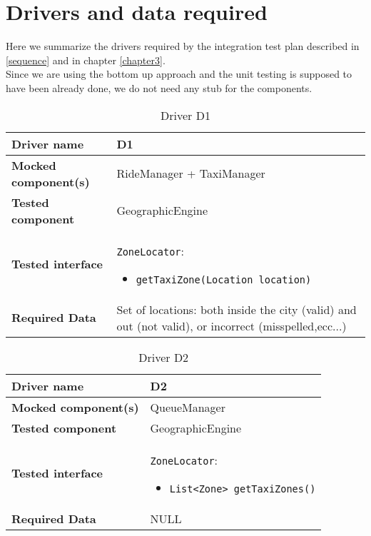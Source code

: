 \section{Drivers and data required}
Here we summarize the drivers required by the integration test plan described in \ref{sequence} and in chapter \ref{chapter3}.\\ Since we are using the bottom up approach and the unit testing is supposed to have been already done, we do not need any stub for the components.

\begin{table}[H]
	\begin{tabular}{ l | p{} }
		\textbf{Driver name} & D1\label{D1} \\ \hline
		\textbf{Mocked component(s)} & RideManager + TaxiManager \\ \hline
		\textbf{Tested component} & GeographicEngine \\ \hline
		\textbf{Tested interface} & \texttt{ZoneLocator}:
				\begin{itemize}
					\item \texttt{getTaxiZone(Location location)}
				\end{itemize} \\ \hline
		\textbf{Required Data} & Set of locations: both inside the city (valid) and out (not valid), or incorrect (misspelled,ecc...)
	\end{tabular}
	\caption{Driver D1}
\end{table}

\begin{table}[H]
	\begin{tabular}{ l | p{} }
		\textbf{Driver name} & D2\label{D2} \\ \hline
		\textbf{Mocked component(s)} & QueueManager \\ \hline
		\textbf{Tested component} & GeographicEngine \\ \hline
		\textbf{Tested interface} & \texttt{ZoneLocator}: \begin{itemize}
					\item \texttt{List<Zone> getTaxiZones()}
				\end{itemize} \\ \hline
		\textbf{Required Data} & NULL
	\end{tabular}
	\caption{Driver D2}
\end{table}

